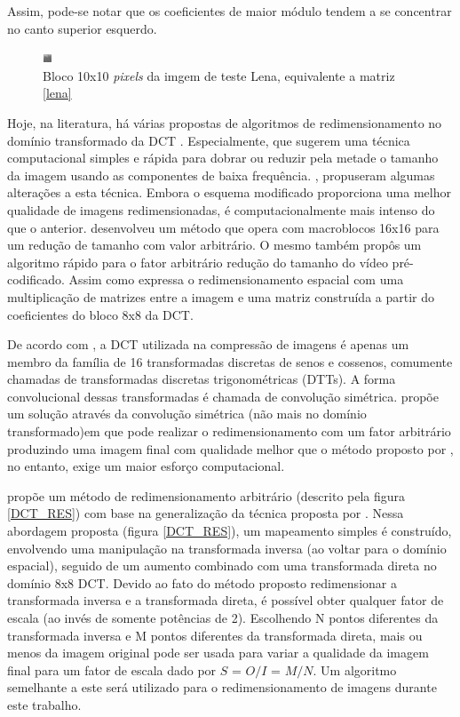 \noindent Assim, pode-se notar que os coeficientes de maior módulo tendem a se concentrar no canto superior esquerdo. 

\begin{figure}[h]
	\centering
	\includegraphics[scale=4]{figuras/BLOCO.png}
	\caption{Bloco 10x10 \textit{pixels} da imgem de teste Lena, equivalente a matriz \ref{lena}}
	\label{PEDACO_LENA}
\end{figure}

Hoje, na literatura, há várias propostas de algoritmos de redimensionamento no domínio transformado da DCT \cite{patil2006fast2,chang1995manipulation,wang2010adaptive}. Especialmente,  que sugerem uma técnica computacional simples e rápida para dobrar ou reduzir pela metade o tamanho da imagem usando as componentes de baixa frequência. , propuseram algumas alterações a esta técnica. Embora o esquema modificado proporciona uma melhor qualidade de imagens redimensionadas, é computacionalmente mais intenso do que o anterior.  desenvolveu um método que opera com macroblocos 16x16 para um redução de tamanho com valor arbitrário. O mesmo também propôs um algoritmo rápido para o fator arbitrário redução do tamanho do vídeo pré-codificado. Assim como expressa o redimensionamento espacial com uma multiplicação de matrizes entre a imagem e uma matriz construída a partir do coeficientes do bloco 8x8 da DCT.

De acordo com , a DCT utilizada na compressão de imagens é apenas um membro da família de 16 transformadas discretas de senos e cossenos, comumente chamadas de transformadas discretas trigonométricas (DTTs). A forma convolucional dessas transformadas é chamada de convolução simétrica.  propõe um solução através da convolução simétrica (não mais no domínio transformado)em que pode realizar o redimensionamento com um fator arbitrário produzindo uma imagem final com qualidade melhor que o método proposto por , no entanto, exige um maior esforço computacional.

 propõe um método de redimensionamento arbitrário (descrito pela figura \ref{DCT_RES}) com base na generalização da técnica proposta por . Nessa abordagem proposta (figura \ref{DCT_RES}), um mapeamento simples é construído, envolvendo uma manipulação na transformada inversa (ao voltar para o domínio espacial), seguido de um aumento combinado com uma transformada direta no domínio 8x8 DCT. Devido ao fato do método proposto redimensionar a transformada inversa e a transformada direta, é possível obter qualquer fator de escala (ao invés de somente potências de 2). Escolhendo N pontos diferentes da transformada inversa e M pontos diferentes da transformada direta, mais ou menos da imagem original pode ser usada para variar a qualidade da imagem final para um fator de escala dado por $S$ = $O/I$ = $M/N$.  Um algoritmo semelhante a este será utilizado para o redimensionamento de imagens durante este trabalho. 

